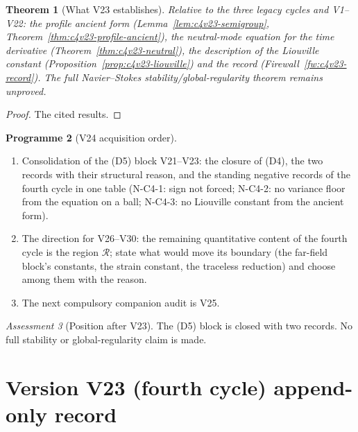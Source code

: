 \documentclass[11pt]{article}
\theoremstyle{plain}
\newtheorem{theorem}{Theorem}[section]
\theoremstyle{definition}
\newtheorem{programme}[theorem]{Programme}
\theoremstyle{remark}
\newtheorem{assessment}[theorem]{Assessment}
\begin{document}
\begin{theorem}[What V23 establishes]
\label{thm:c4v23-conclusion}
Relative to the three legacy cycles and V1--V22: the profile ancient
form (Lemma~\ref{lem:c4v23-semigroup}, Theorem~\ref{thm:c4v23-profile-ancient}),
the neutral-mode equation for the time derivative (Theorem~\ref{thm:c4v23-neutral}),
the description of the Liouville constant (Proposition~\ref{prop:c4v23-liouville})
and the record (Firewall~\ref{fw:c4v23-record}).  The full Navier--Stokes
stability/global-regularity theorem remains unproved.
\end{theorem}

\begin{proof}
The cited results.
\end{proof}

\begin{programme}[V24 acquisition order]
\label{prog:c4v24}
\begin{enumerate}[label=\textup{(AC\arabic*)},leftmargin=4.8em]
\item Consolidation of the (D5) block V21--V23: the closure of (D4),
      the two records with their structural reason, and the standing
      negative records of the fourth cycle in one table (N-C4-1: sign
      not forced; N-C4-2: no variance floor from the equation on a
      ball; N-C4-3: no Liouville constant from the ancient form).
\item The direction for V26--V30: the remaining quantitative content
      of the fourth cycle is the region \(\mathcal R\); state what would move
      its boundary (the far-field block's constants, the strain
      constant, the traceless reduction) and choose among them with
      the reason.
\item The next compulsory companion audit is V25.
\end{enumerate}
\end{programme}

\begin{assessment}[Position after V23]
\label{ass:c4v23-position}
The (D5) block is closed with two records.  No full stability or
global-regularity claim is made.
\end{assessment}

\section*{Version V23 (fourth cycle) append-only record}
\end{document}
